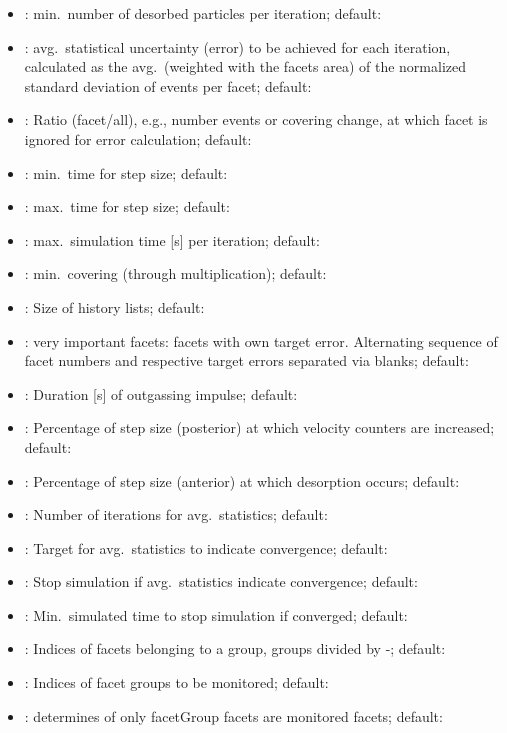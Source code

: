 \begin{itemize}[noitemsep,topsep=0pt, partopsep=0pt]
\item {}: min.\ number of desorbed particles per iteration; default: 
\item {}: avg.\ statistical uncertainty (error) to be achieved for each iteration, calculated as the avg.\ (weighted with the facets area) of the normalized standard deviation of events per facet; default: 
\item {}: Ratio (facet/all), e.g., number events or covering change, at which facet is ignored for error calculation; default: 
\item {}: min.\ time for step size; default:
\item {}: max.\ time for step size; default:
\item {}: max.\ simulation time [s] per iteration; default:
\item {}: min.\ covering (through multiplication); default:
\item {}: Size of history lists; default:
\item {}: very important facets: facets with own target error. Alternating sequence of facet numbers and respective target errors separated via blanks; default:\codew{[]}
\item {}: Duration [s] of outgassing impulse; default: 
\item {}: Percentage of step size (posterior) at which velocity counters are increased; default: 
\item {}: Percentage of step size (anterior) at which desorption occurs; default: 
\item {}: Number of iterations for avg.\ statistics; default: 
\item {}: Target for avg.\ statistics to indicate convergence; default: 
\item {}: Stop simulation if avg.\ statistics indicate convergence; default: 
\item {}: Min.\ simulated time to stop simulation if converged; default: 
\item {}:  Indices of facets belonging to a group, groups divided by -; default:\codew{[]}
\item {}: Indices of facet groups to be monitored; default:\codew{[]}
\item {}: determines of only facetGroup facets are monitored facets; default:
\end{itemize}
